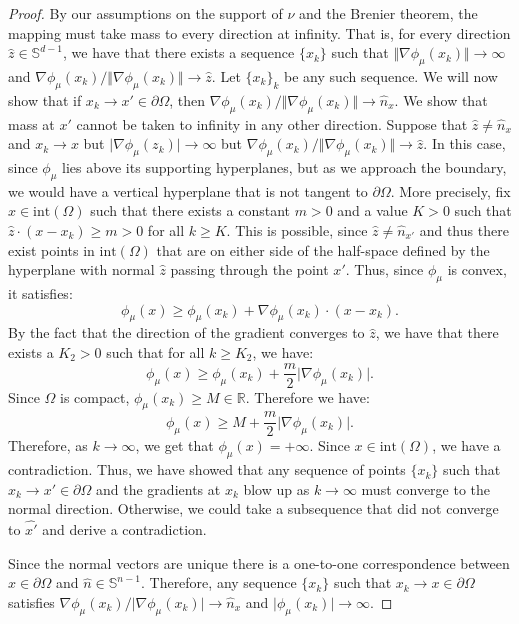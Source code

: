 \documentclass{amsart}
\theoremstyle{lemma}
\theoremstyle{remark}
\begin{document}
\begin{proof}
By our assumptions on the support of $\nu$ and the Brenier theorem, the mapping must take mass to every direction at infinity. That is, for every direction $\hat{z} \in \mathbb{S}^{d-1}$, we have that there exists a sequence $\{ x_k \}$ such that $\Vert \nabla \phi_{\mu}(x_k) \Vert \rightarrow \infty$ and $\nabla \phi_{\mu}(x_k) / \Vert \nabla \phi_{\mu}(x_k) \Vert \rightarrow \hat{z}$. Let $\{ x_k \}_{k}$ be any such sequence. We will now show that if $x_k \rightarrow x' \in \partial \Omega$, then $\nabla \phi_{\mu}(x_k) / \Vert \nabla \phi_{\mu}(x_k) \Vert \rightarrow \hat{n}_{x}$. We show that mass at $x'$ cannot be taken to infinity in any other direction. Suppose that $\hat{z} \neq \hat{n}_{x}$ and $x_k \rightarrow x$ but $\vert \nabla \phi_{\mu}(z_k) \vert \rightarrow \infty$ but $\nabla \phi_{\mu}(x_k) / \Vert \nabla \phi_{\mu}(x_k) \Vert \rightarrow \hat{z}$. In this case, since $\phi_{\mu}$ lies above its supporting hyperplanes, but as we approach the boundary, we would have a vertical hyperplane that is not tangent to $\partial \Omega$. More precisely, fix $x \in \text{int}(\Omega)$ such that there exists a constant $m>0$ and a value $K > 0$ such that $\hat{z} \cdot (x - x_k) \geq m>0$ for all $k \geq K$. This is possible, since $\hat{z} \neq \hat{n}_{x'}$ and thus there exist points in $\text{int}(\Omega)$ that are on either side of the half-space defined by the hyperplane with normal $\hat{z}$ passing through the point $x'$. Thus, since $\phi_{\mu}$ is convex, it satisfies:
\begin{equation}
\phi_{\mu}(x) \geq \phi_{\mu}(x_k) + \nabla \phi_{\mu}(x_k) \cdot (x - x_k).
\end{equation}
By the fact that the direction of the gradient converges to $\hat{z}$, we have that there exists a $K_2 >0$ such that for all $k \geq K_2$, we have:
\begin{equation}
\phi_{\mu}(x) \geq \phi_{\mu}(x_k) + \frac{m}{2} \vert \nabla \phi_{\mu}(x_k) \vert.
\end{equation}
Since $\Omega$ is compact, $\phi_{\mu}(x_k) \geq M \in \mathbb{R}$. Therefore we have:
\begin{equation}
\phi_{\mu}(x) \geq M + \frac{m}{2} \vert \nabla \phi_{\mu}(x_k) \vert.
\end{equation}
Therefore, as $k \rightarrow \infty$, we get that $\phi_{\mu}(x) = + \infty$. Since $x \in \text{int}(\Omega)$, we have a contradiction. Thus, we have showed that any sequence of points $\{ x_k \}$ such that $x_k \rightarrow x' \in \partial \Omega$ and the gradients at $x_k$ blow up as $k \rightarrow \infty$ must converge to the normal direction. Otherwise, we could take a subsequence that did not converge to $\hat{x'}$ and derive a contradiction.

Since the normal vectors are unique there is a one-to-one correspondence between $x \in \partial \Omega$ and $\hat{n} \in \mathbb{S}^{n-1}$. Therefore, any sequence $\{ x_{k} \}$ such that $x_k \rightarrow x \in \partial \Omega$ satisfies $\nabla \phi_{\mu}(x_k) / \vert \nabla \phi_{\mu}(x_k) \vert \rightarrow \hat{n}_{x}$ and $\vert \phi_{\mu}(x_k) \vert \rightarrow \infty$.
\end{proof}
\end{document}
